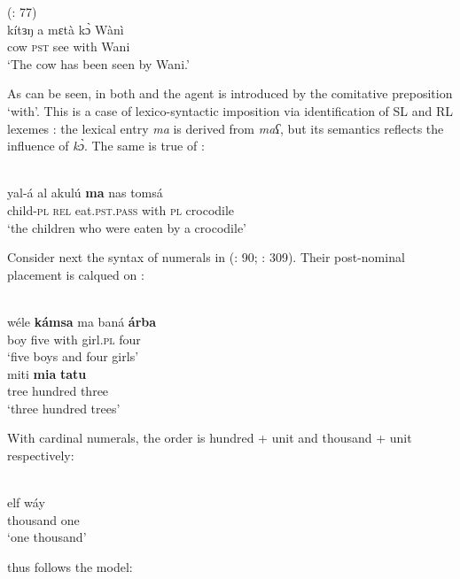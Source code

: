 \documentclass[output=paper]{langsci/langscibook}
\begin{document}
\ex
{ (\citealt{BurengVincent1986}: 77)}\\
\gll             kítɜŋ a mɛtà kɔ̀ Wànì\\
                 cow \textsc{pst} see with Wani\\
\glt     `The cow has been seen by Wani.'
\z
\z

As can be seen, in both   and  the agent is introduced by the comitative {preposition} ‘with’. This is a case of lexico-syntactic {imposition} via identification of {SL} and {RL} lexemes \citep[415]{Manfredi2018}: the   lexical entry \textit{ma} is derived from   \textit{maʕ}, but its semantics reflects the influence of  \textit{kɔ̀}. The same is true of :

\ea
{        \citep[230]{Luffin2005}}\\
\gll yal-á al akulú \textbf{ma} nas tomsá\\
     child-\textsc{pl} \textsc{rel} eat.\textsc{pst.pass} with \textsc{pl} crocodile\\
\glt     `the children who were eaten by a crocodile'
\z

Consider next the syntax of {numerals} in  (\citealt{Wellens2003}: 90; \citealt{Luffin2014}: 309). Their post-nominal placement is calqued on :

\ea
{ \citep[309]{Luffin2014}}\\
\gll wéle \textbf{kámsa} ma baná \textbf{árba}\\
     boy five with girl.\textsc{pl} four\\
\glt     `five boys and four girls'
\ex
{ \citep[309]{Luffin2014}}\\
\gll miti \textbf{mia} \textbf{tatu}\\
     tree hundred three\\
\glt     `three hundred trees'
\z

With cardinal {numerals}, the order is hundred + unit and thousand + unit respectively:

 

 \ea
{ \citep[309]{Luffin2014}}\\

\gll   elf wáy\\
       thousand one\\
\glt      `one thousand'
\z

 thus follows the  model:
\end{document}
